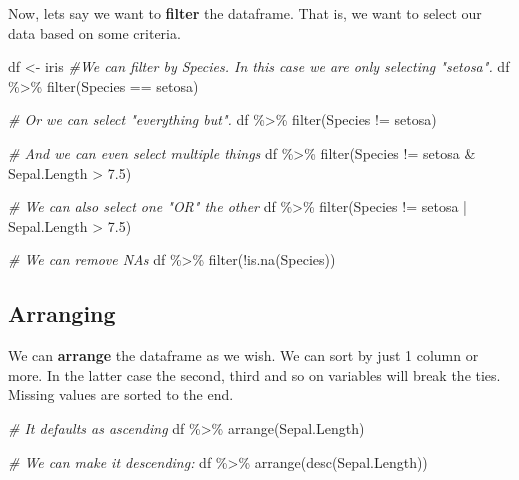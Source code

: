 \documentclass[
]{book}
\newenvironment{Shaded}{\begin{snugshade}}{\end{snugshade}}
\newcommand{\CommentTok}[1]{\textcolor[rgb]{0.56,0.35,0.01}{\textit{#1}}}
\newcommand{\FloatTok}[1]{\textcolor[rgb]{0.00,0.00,0.81}{#1}}
\newcommand{\FunctionTok}[1]{\textcolor[rgb]{0.00,0.00,0.00}{#1}}
\newcommand{\NormalTok}[1]{#1}
\newcommand{\OtherTok}[1]{\textcolor[rgb]{0.56,0.35,0.01}{#1}}
\newcommand{\SpecialCharTok}[1]{\textcolor[rgb]{0.00,0.00,0.00}{#1}}
\newcommand{\StringTok}[1]{\textcolor[rgb]{0.31,0.60,0.02}{#1}}
\begin{document}
Now, lets say we want to \textbf{filter} the dataframe.
That is, we want to select our data based on some criteria.

\begin{Shaded}
\begin{Highlighting}[]
\NormalTok{df }\OtherTok{\textless{}{-}}\NormalTok{ iris}
\CommentTok{\#We can filter by Species. In this case we are only selecting "setosa".}
\NormalTok{df }\SpecialCharTok{\%\textgreater{}\%} 
  \FunctionTok{filter}\NormalTok{(Species }\SpecialCharTok{==} \StringTok{\textquotesingle{}setosa\textquotesingle{}}\NormalTok{)}

\CommentTok{\# Or we can select "everything but".}
\NormalTok{df }\SpecialCharTok{\%\textgreater{}\%} 
  \FunctionTok{filter}\NormalTok{(Species }\SpecialCharTok{!=} \StringTok{\textquotesingle{}setosa\textquotesingle{}}\NormalTok{)}

\CommentTok{\# And we can even select multiple things}
\NormalTok{df }\SpecialCharTok{\%\textgreater{}\%} 
  \FunctionTok{filter}\NormalTok{(Species }\SpecialCharTok{!=} \StringTok{\textquotesingle{}setosa\textquotesingle{}} \SpecialCharTok{\&}\NormalTok{ Sepal.Length }\SpecialCharTok{\textgreater{}} \FloatTok{7.5}\NormalTok{)}

\CommentTok{\# We can also select one "OR" the other}
\NormalTok{df }\SpecialCharTok{\%\textgreater{}\%} 
  \FunctionTok{filter}\NormalTok{(Species }\SpecialCharTok{!=} \StringTok{\textquotesingle{}setosa\textquotesingle{}} \SpecialCharTok{|}\NormalTok{ Sepal.Length }\SpecialCharTok{\textgreater{}} \FloatTok{7.5}\NormalTok{)}

\CommentTok{\# We can remove NAs}
\NormalTok{df }\SpecialCharTok{\%\textgreater{}\%} 
  \FunctionTok{filter}\NormalTok{(}\SpecialCharTok{!}\FunctionTok{is.na}\NormalTok{(Species))}
\end{Highlighting}
\end{Shaded}

\hypertarget{arranging}{%
\subsection{Arranging}\label{arranging}}

We can \textbf{arrange} the dataframe as we wish.
We can sort by just 1 column or more.
In the latter case the second, third and so on variables will break the ties.
Missing values are sorted to the end.

\begin{Shaded}
\begin{Highlighting}[]
\CommentTok{\# It defaults as ascending}
\NormalTok{df }\SpecialCharTok{\%\textgreater{}\%} 
  \FunctionTok{arrange}\NormalTok{(Sepal.Length)}

\CommentTok{\# We can make it descending:}
\NormalTok{df }\SpecialCharTok{\%\textgreater{}\%} 
  \FunctionTok{arrange}\NormalTok{(}\FunctionTok{desc}\NormalTok{(Sepal.Length))}
\end{Highlighting}
\end{Shaded}
\end{document}
